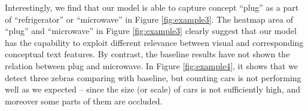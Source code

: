 \documentclass{article}
\begin{document}
Interestingly, we find that our model is able to capture concept ``plug'' as a part of ``refrigerator'' or ``microwave'' in Figure \ref{fig:example3}. The heatmap area of ``plug'' and ``microwave'' in Figure \ref{fig:example3} clearly suggest that our model has the capability to exploit different relevance between visual and corresponding conceptual text features. By contrast, the baseline results have not shown the relation between plug and microwave. In Figure \ref{fig:example4}, it shows that we detect three zebras comparing with baseline, but counting cars is not performing well as we expected  -- since the size (or scale) of cars is not sufficiently high, and moreover some parts of them are occluded.



\setlength{\textfloatsep}{8pt}
\end{document}
